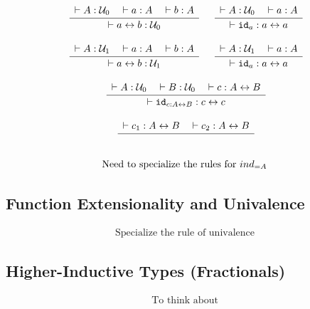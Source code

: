 \documentclass[format=acmlarge,review,natbib]{acmart}
\newcommand{\idc}{\mathtt{id}}
\newcommand{\iso}{\leftrightarrow}
\newcommand{\uzero}{\mathcal{U}_0}
\newcommand{\uone}{\mathcal{U}_1}
\newcommand{\Rule}[2]{
\makebox{
$\displaystyle
\frac{\begin{array}{l}#1\\\end{array}}
{\begin{array}{l}#2\\\end{array}}$}}
\newcommand{\proves}{\vdash}
\newcommand{\jdg}[3]{#1 \proves #2 : #3}
\begin{document}
\[\begin{array}{c}
\Rule{\jdg{}{A}{\uzero}
         \quad\jdg{}{a}{A}
         \quad\jdg{}{b}{A}}
        {\jdg{}{a \iso b}{\uzero}}
\quad
\Rule{\jdg{}{A}{\uzero}
          \quad\jdg{}{a}{A}}
         {\jdg{}{\idc_{a}}{a \iso a}}
\\
\\
\Rule{\jdg{}{A}{\uone}
         \quad\jdg{}{a}{A}
         \quad\jdg{}{b}{A}}
        {\jdg{}{a \iso b}{\uone}}
\quad
\Rule{\jdg{}{A}{\uone}
          \quad\jdg{}{a}{A}}
         {\jdg{}{\idc_{a}}{a \iso a}}
\\
\\
\Rule{\jdg{}{A}{\uzero}
         \quad\jdg{}{B}{\uzero}
         \quad\jdg{}{c}{A \iso B}}
         {\jdg{}{\idc_{c:A\iso B}}{c \iso c}}
\\
\\
\Rule{\jdg{}{c_1}{A \iso B}
         \quad\jdg{}{c_2}{A \iso B}}
         {}
\\
\\
\mbox{Need to specialize the rules for } ind_{=A}
\end{array}\]

\subsection{Function Extensionality and Univalence}

\[\begin{array}{c}
\mbox{Specialize the rule of univalence}
\end{array}\]

\subsection{Higher-Inductive Types (Fractionals)}

\[\begin{array}{c}
\mbox{To think about}
\end{array}\]


{\footnotesize

}
\end{document}
